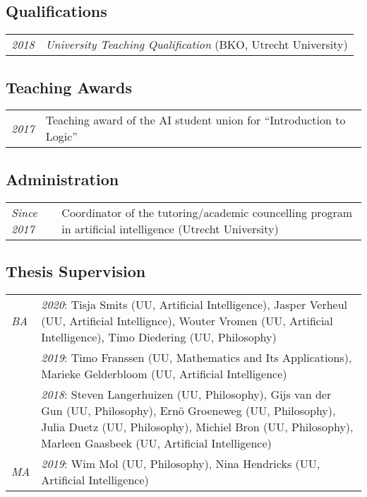 \subsection*{Qualifications}

\begin{tabular}{l p{\linewidth}}
  \emph{2018} & \emph{University Teaching Qualification} (BKO, Utrecht University)
\end{tabular}

\subsection*{Teaching Awards}

\begin{tabular}{p{.1\linewidth} l}
  \emph{2017} & Teaching award of the AI student union for ``Introduction to Logic''
\end{tabular}

\subsection*{Administration}
	
\begin{tabular}{p{.15\linewidth} p{.8\linewidth}}
  \emph{Since 2017} & Coordinator of the tutoring/academic councelling program in artificial intelligence (Utrecht University)\\
\end{tabular}

\subsection*{Thesis Supervision}

\begin{tabular}{p{.1\linewidth} p{.8\linewidth}}
  \emph{BA}  & \emph{2020}: Tisja Smits (UU, Artificial Intelligence), Jasper Verheul (UU, Artificial
                            Intellignce), Wouter Vromen (UU, Artificial Intelligence),
                            Timo Diedering (UU, Philosophy)\\
             & \emph{2019}: Timo Franssen (UU, Mathematics and Its
                            Applications), Marieke Gelderbloom (UU, Artificial Intelligence)\\
             & \emph{2018}: Steven Langerhuizen (UU, Philosophy), Gijs van der
                            Gun (UU, Philosophy), Ern\"o Groeneweg (UU, Philosophy), Julia Duetz (UU,
                            Philosophy), Michiel Bron (UU, Philosophy), Marleen Gaasbeek (UU, Artificial
                            Intelligence)\\[1ex]
  \emph{MA}  & \emph{2019}: Wim Mol (UU, Philosophy), Nina Hendricks (UU, Artificial Intelligence)\\
\end{tabular}

